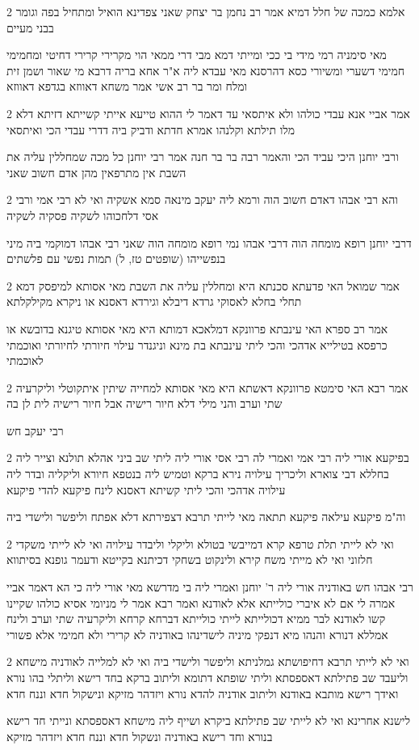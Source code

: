 \documentclass[12pt, openany]{book}
\newcommand{\sethebfont}{
\fontsize{10.5pt}{21.0pt} \selectfont
}
\newcommand{\twocol}[1]{
	{\sethebfont \begin{multicols}{2}
			#1
	\end{multicols}}	
}
\begin{document}
\twocol{אלמא כמכה של חלל דמיא אמר רב נחמן בר יצחק שאני צפדינא הואיל ומתחיל בפה וגומר בבני מעיים
\par מאי סימניה רמי מידי בי ככי ומייתי דמא מבי דרי ממאי הוי מקרירי קרירי דחיטי ומחמימי חמימי דשערי ומשיורי כסא דהרסנא מאי עבדא ליה א"ר אחא בריה דרבא מי שאור ושמן זית ומלח ומר בר רב אשי אמר משחא דאווזא בגדפא דאווזא}
\twocol{אמר אביי אנא עבדי כולהו ולא איתסאי עד דאמר לי ההוא טייעא אייתי קשייתא דזיתא דלא מלו תילתא וקלנהו אמרא חדתא ודביק ביה דדרי עבדי הכי ואיתסאי
\par ורבי יוחנן היכי עביד הכי והאמר רבה בר בר חנה אמר רבי יוחנן כל מכה שמחללין עליה את השבת אין מתרפאין מהן אדם חשוב שאני}
\twocol{והא רבי אבהו דאדם חשוב הוה ורמא ליה יעקב מינאה סמא אשקיה ואי לא רבי אמי ורבי אסי דלחכוהו לשקיה פסקיה לשקיה
\par דרבי יוחנן רופא מומחה הוה דרבי אבהו נמי רופא מומחה הוה שאני רבי אבהו דמוקמי ביה מיני בנפשייהו (שופטים טז, ל) תמות נפשי עם פלשתים}
\twocol{אמר שמואל האי פדעתא סכנתא היא ומחללין עליה את השבת מאי אסותא למיפסק דמא תחלי בחלא לאסוקי גרדא דיבלא וגירדא דאסנא או ניקרא מקילקלתא
\par אמר רב ספרא האי עינבתא פרוונקא דמלאכא דמותא היא מאי אסותא טיגנא בדובשא או כרפסא בטילייא אדהכי והכי ליתי עינבתא בת מינא וניגנדר עילוי חיורתי לחיורתי ואוכמתי לאוכמתי}
\twocol{אמר רבא האי סימטא פרוונקא דאשתא היא מאי אסותא למחייה שיתין איתקוטלי וליקרעיה שתי וערב והני מילי דלא חיור רישיה אבל חיור רישיה לית לן בה
\par רבי יעקב חש}
\twocol{בפיקעא אורי ליה רבי אמי ואמרי לה רבי אסי אורי ליה ליתי שב ביני אהלא תולנא וצייר ליה בחללא דבי צוארא וליכריך עילויה נירא ברקא וטמיש ליה בנטפא חיורא וליקליה ובדר ליה עילויה אדהכי והכי ליתי קשיתא דאסנא לינח פיקעא להדי פיקעא
\par וה"מ פיקעא עילאה פיקעא תתאה מאי לייתי תרבא דצפירתא דלא אפתח וליפשר ולישדי ביה}
\twocol{ואי לא לייתי תלת טרפא קרא דמייבשי בטולא וליקלי וליבדר עילויה ואי לא לייתי משקדי חלזוני ואי לא מייתי משח קירא ולינקוט בשחקי דכיתנא בקייטא ודעמר גופנא בסיתווא
\par רבי אבהו חש באודניה אורי ליה ר' יוחנן ואמרי ליה בי מדרשא מאי אורי ליה כי הא דאמר אביי אמרה לי אם לא איברי כולייתא אלא לאודנא ואמר רבא אמר לי מניומי אסיא כולהו שקיינו קשו לאודנא לבר ממיא דכולייתא לייתי כולייתא דברחא קרחא וליקרעיה שתי וערב ולינח אמללא דנורא והנהו מיא דנפקי מיניה לישדינהו באודניה לא קרירי ולא חמימי אלא פשורי}
\twocol{ואי לא לייתי תרבא דחיפושתא גמלניתא וליפשר ולישדי ביה ואי לא למלייה לאודניה מישחא וליעבד שב פתילתא דאספסתא וליתי שופתא דתומא וליתוב ברקא בחד רישא וליתלי בהו נורא ואידך רישא מותבא באודנא וליתוב אודניה להדא נורא ויזדהר מזיקא ונישקול חדא וננח חדא
\par לישנא אחרינא ואי לא לייתי שב פתילתא ביקרא ושייף ליה מישחא דאספסתא ונייתי חד רישא בנורא וחד רישא באודניה ונשקול חדא וננח חדא ויזדהר מזיקא}
\end{document}
